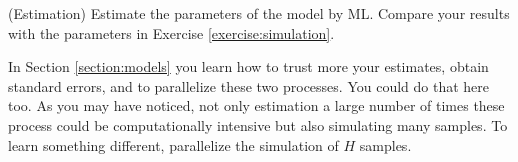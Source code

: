 \begin{exercise} (Estimation)
Estimate the parameters of the model by ML. Compare your results with the parameters in Exercise \ref{exercise:simulation}.
\end{exercise}

\begin{exercise}
In Section \ref{section:models} you learn how to trust more your estimates, obtain standard errors, and to parallelize these two processes. You could do that here too. As you may have noticed, not only estimation a large number of times these process could be computationally intensive but also simulating many samples. To learn something different, parallelize the simulation of $H$ samples.
\end{exercise}